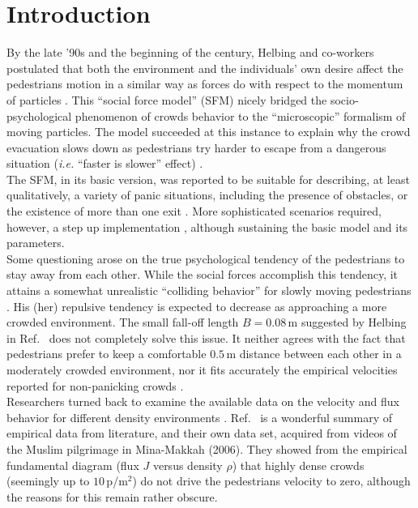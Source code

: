 \section{\label{introduction}Introduction}

By the late '90s and the beginning of the century, Helbing and co-workers 
postulated that both the environment and the individuals' own desire affect 
the pedestrians motion in a similar way as forces do with respect to the 
momentum of particles \cite{Helbing1,Helbing4}. This ``social force model'' 
(SFM) nicely bridged the socio-psychological phenomenon of crowds 
behavior to the ``microscopic'' formalism of moving particles. The model 
succeeded at this instance to explain why the crowd evacuation slows down 
as pedestrians try harder to escape from a dangerous situation 
(\textit{i.e.} ``faster is slower'' effect) \cite{Helbing1,Dorso1,Dorso2}. \\ 

The SFM, in its basic version, was reported to be suitable for describing, 
at least qualitatively, a variety of panic situations, including the presence
of obstacles, or the existence of more than one exit \cite{Dorso3,Dorso5}.
More sophisticated scenarios required, however, a step up implementation
\cite{Dorso4,Dorso6,Cornes1}, although sustaining the basic model and its parameters.  \\

Some questioning arose on the true psychological tendency of the pedestrians to 
stay away from each other. While the social forces accomplish this tendency, it 
attains a somewhat unrealistic ``colliding behavior'' for slowly moving 
pedestrians \cite{Lakoba}. His (her) repulsive tendency is expected to decrease 
as approaching a more crowded environment. The small fall-off length $B=0.08\,$m 
suggested by Helbing in Ref.~\cite{Helbing1} does not completely solve this 
issue. It neither agrees with the fact that pedestrians prefer to keep a 
comfortable $0.5\,$m distance between each other in a moderately crowded 
environment, nor it fits accurately the empirical velocities reported for 
non-panicking crowds \cite{Lakoba}.  \\

Researchers turned back to examine the available data on the velocity and flux 
behavior for different density environments \cite{helbing3,seyfried,seyfried1}. 
Ref.~\cite{helbing3} is a wonderful summary of empirical data from literature, 
and their own data set, acquired from videos of the Muslim pilgrimage in 
Mina-Makkah (2006). They showed from the empirical fundamental diagram (flux $J$ 
versus density $\rho$) that highly dense crowds (seemingly up to $10\,$p/m$^2$) 
do not drive the pedestrians velocity to zero, although the reasons for this 
remain rather obscure.   \\


